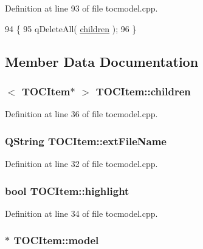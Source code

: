 Definition at line 93 of file tocmodel.\+cpp.


\begin{DoxyCode}
94 \{
95     qDeleteAll( \hyperlink{structTOCItem_ae6af06a9560cf19b909c1417c9bef826}{children} );
96 \}
\end{DoxyCode}


\subsection{Member Data Documentation}
\hypertarget{structTOCItem_ae6af06a9560cf19b909c1417c9bef826}{
\subsubsection[{children}]{$<$ {\bf T\+O\+C\+Item}$\ast$ $>$ T\+O\+C\+Item\+::children}}\label{structTOCItem_ae6af06a9560cf19b909c1417c9bef826}


Definition at line 36 of file tocmodel.\+cpp.

\hypertarget{structTOCItem_a35a5cc31947557c3acf0608688ed2346}{
\subsubsection[{ext\+File\+Name}]{\setlength{\rightskip}{0pt plus 5cm}Q\+String T\+O\+C\+Item\+::ext\+File\+Name}}\label{structTOCItem_a35a5cc31947557c3acf0608688ed2346}


Definition at line 32 of file tocmodel.\+cpp.

\hypertarget{structTOCItem_a7e46da40ebe84b7c202695a181d7c52e}{
\subsubsection[{highlight}]{\setlength{\rightskip}{0pt plus 5cm}bool T\+O\+C\+Item\+::highlight}}\label{structTOCItem_a7e46da40ebe84b7c202695a181d7c52e}


Definition at line 34 of file tocmodel.\+cpp.

\hypertarget{structTOCItem_affbfd5aed8656b2a5c11588b192e701e}{
\subsubsection[{model}]{$\ast$ T\+O\+C\+Item\+::model}}\label{structTOCItem_affbfd5aed8656b2a5c11588b192e701e}


